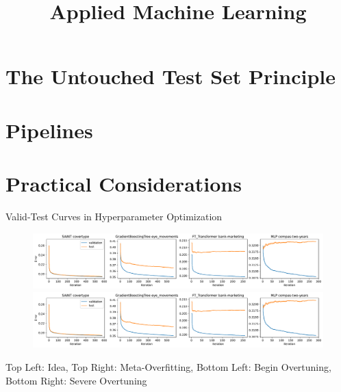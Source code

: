 \documentclass[11pt,compress,t,notes=noshow, xcolor=table]{beamer}
\title{Applied Machine Learning}
\date{}
\begin{document}


\section{The Untouched Test Set Principle}





\section{Pipelines}


\section{Practical Considerations}

\begin{frame}{Valid-Test Curves in Hyperparameter Optimization}
    \begin{figure}
        \centering
        \includegraphics[width=0.7\linewidth,trim=0 0 540 0, clip]{figure_man/figure_1.pdf}
        \includegraphics[width=0.7\linewidth,trim=540 0 0 0, clip]{figure_man/figure_1.pdf}
    \end{figure}
    Top Left: Idea, Top Right: Meta-Overfitting, Bottom Left: Begin Overtuning, Bottom Right: Severe Overtuning
\end{frame}
\end{document}

